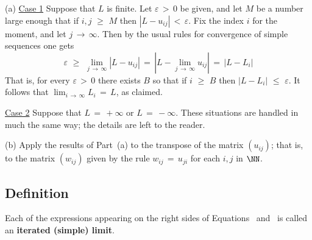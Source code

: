{\V

        (a) \underline{Case 1} Suppose that $L$ is finite. Let ${\varepsilon}\,>\,0$ be given, and let $M$ be a number large enough that if $i,j\,\,{\geq}\,\,M$ then $|L-u_{ij}|\,<\,{\varepsilon}$.
    Fix the index $i$ for the moment, and let $j \,{\rightarrow}\, {\infty}$.
    Then by the usual rules for convergence of simple sequences one gets
        \begin{displaymath}
        {\varepsilon}\,\,{\geq}\,\,\lim_{j \,{\rightarrow}\, {\infty}} |L-u_{ij}| \,=\, |L-\lim_{j \,{\rightarrow}\, {\infty}} u_{ij}| \,=\, |L-L_{i}|
        \end{displaymath}
    That is, for every ${\varepsilon}\,>\,0$ there exists $B$ so that if $i\,\,{\geq}\,\,B$ then $|L-L_{i}|\,\,{\leq}\,\,{\varepsilon}$.
    It follows that $\lim_{i \,{\rightarrow}\, {\infty}} L_{i} \,=\, L$, as claimed.

        \underline{Case 2} Suppose that $L \,=\, +{\infty}$ or $L \,=\, -{\infty}$.
    These situations are handled in much the same way; the details are left to the reader.

\V

        (b) Apply the results of Part~(a) to the transpose of the matrix $(u_{ij})$;
    that is, to the matrix $(w_{ij})$ given by the rule $w_{ij} \,=\, u_{ji}$ for each $i,j$ in ${\NN}$.

\V
\V

            \subsection{\small{\bf Definition}}
            \label{DefC100.140}

        Each of the expressions appearing on the right sides of Equations~ and~ is called an {\bf iterated (simple) limit}.
}%

\newpage


